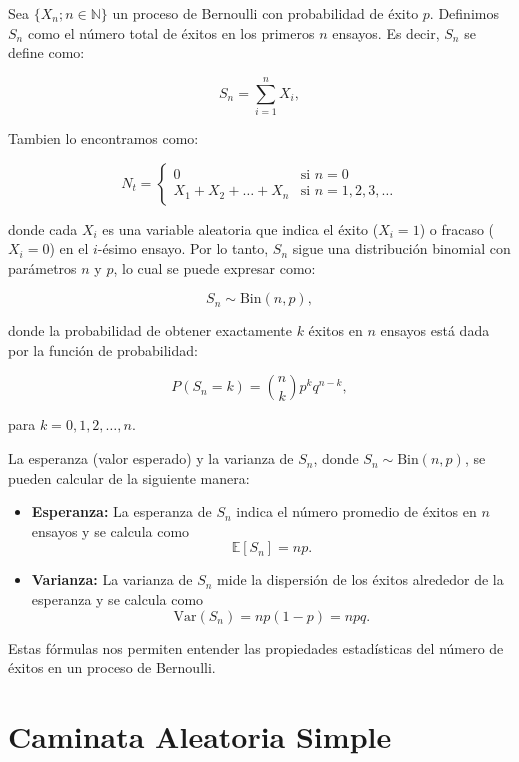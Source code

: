\documentclass{article}
\begin{document}
Sea $\{X_n; n \in \mathbb{N}\}$ un proceso de Bernoulli con probabilidad de éxito $p$. Definimos $S_n$ como el número total de éxitos en los primeros $n$ ensayos. Es decir, $S_n$ se define como:

\[
    S_n = \sum_{i=1}^{n} X_i,
\]

Tambien lo encontramos como:

\[
    N_t =
    \begin{cases}
        0                       & \text{si } n=0           \\
        X_1 + X_2 + \dots + X_n & \text{si } n=1,2,3,\dots
    \end{cases}
\]


donde cada $X_i$ es una variable aleatoria que indica el éxito ($X_i = 1$) o fracaso ($X_i = 0$) en el $i$-ésimo ensayo. Por lo tanto, $S_n$ sigue una distribución binomial con parámetros $n$ y $p$, lo cual se puede expresar como:

\[
    S_n \sim \text{Bin}(n, p),
\]

donde la probabilidad de obtener exactamente $k$ éxitos en $n$ ensayos está dada por la función de probabilidad:

\[
    P(S_n = k) = \binom{n}{k} p^k q^{n-k},
\]

para $k = 0, 1, 2, \ldots, n$.

La esperanza (valor esperado) y la varianza de $S_n$, donde $S_n \sim \text{Bin}(n, p)$, se pueden calcular de la siguiente manera:

\begin{itemize}
    \item \textbf{Esperanza:} La esperanza de $S_n$ indica el número promedio de éxitos en $n$ ensayos y se calcula como
          \[
              \mathbb{E}[S_n] = np.
          \]

    \item \textbf{Varianza:} La varianza de $S_n$ mide la dispersión de los éxitos alrededor de la esperanza y se calcula como
          \[
              \text{Var}(S_n) = np(1-p) = npq.
          \]
\end{itemize}

Estas fórmulas nos permiten entender las propiedades estadísticas del número de éxitos en un proceso de Bernoulli.

\section{Caminata Aleatoria Simple}
\end{document}
